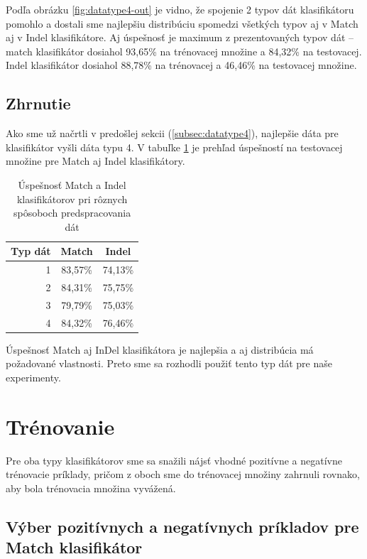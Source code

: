 Podľa obrázku \ref{fig:datatype4-out} je vidno, že spojenie 2 typov dát klasifikátoru pomohlo a dostali sme najlepšiu distribúciu spomedzi všetkých typov aj v Match aj v Indel klasifikátore.
Aj úspešnosť je maximum z prezentovaných typov dát -- match klasifikátor dosiahol 93,65\% na trénovacej množine a 84,32\% na testovacej.
Indel klasifikátor dosiahol 88,78\% na trénovacej a 46,46\% na testovacej množine.

\subsection{Zhrnutie}

Ako sme už načrtli v predošlej sekcii (\ref{subsec:datatype4}), najlepšie dáta pre klasifikátor vyšli dáta typu 4.
V tabuľke \ref{tab:datatype-all} je prehľad úspešností na testovacej množine pre Match aj Indel klasifikátory.

\begin{table}[htp]
\centering
\begin{tabular}{r|cc}
Typ dát & Match & Indel\\
\hline
1 & 83,57\% & 74,13\%\\
2 & 84,31\% & 75,75\%\\
3 & 79,79\% & 75,03\%\\
4 & 84,32\% & 76,46\%\\
\end{tabular}
\caption[Úspešnosť klasifikátorov pri rôznych typoch dát]{Úspešnosť Match a Indel klasifikátorov pri rôznych spôsoboch predspracovania dát}
\label{tab:datatype-all}
\end{table}

Úspešnosť Match aj InDel klasifikátora je najlepšia a aj distribúcia má požadované vlastnosti. Preto sme sa rozhodli použiť tento typ dát pre naše experimenty.

\section{Trénovanie}

Pre oba typy klasifikátorov sme sa snažili nájsť vhodné pozitívne a negatívne trénovacie príklady, pričom z oboch sme do trénovacej množiny zahrnuli rovnako, aby bola trénovacia množina vyvážená.

\subsection{Výber pozitívnych a negatívnych príkladov pre Match klasifikátor}
\label{subsec:matchtraining}

